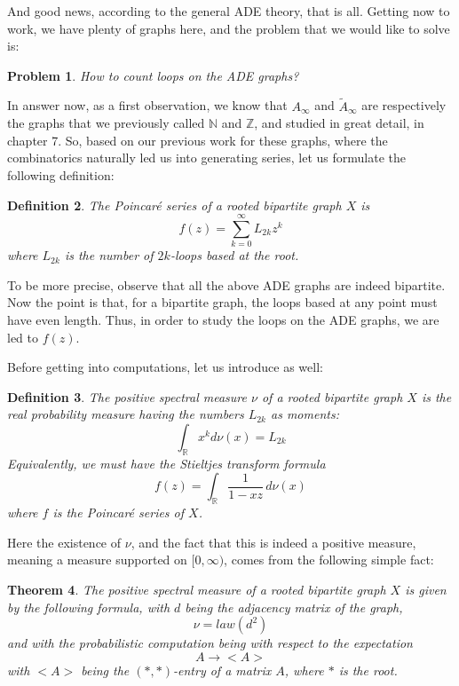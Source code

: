 \documentclass[12pt]{amsbook}
\newtheorem{theorem}{Theorem}[chapter]
\newtheorem{definition}[theorem]{Definition}
\newtheorem{problem}[theorem]{Problem}
\begin{document}
And good news, according to the general ADE theory, that is all. Getting now to work, we have plenty of graphs here, and the problem that we would like to solve is:

\begin{problem}
How to count loops on the ADE graphs?
\end{problem}

In answer now, as a first observation, we know that $A_\infty$ and $\tilde{A}_\infty$ are respectively the graphs that we previously called $\mathbb N$ and $\mathbb Z$, and studied in great detail, in chapter 7. So, based on our previous work for these graphs, where the combinatorics naturally led us into generating series, let us formulate the following definition:


\begin{definition}
The Poincar\'e series of a rooted bipartite graph $X$ is
$$f(z)=\sum_{k=0}^\infty L_{2k}z^k$$
where $L_{2k}$ is the number of $2k$-loops based at the root.
\end{definition}

To be more precise, observe that all the above ADE graphs are indeed bipartite. Now the point is that, for a bipartite graph, the loops based at any point must have even length. Thus, in order to study the loops on the ADE graphs, we are led to $f(z)$.

\bigskip

Before getting into computations, let us introduce as well:


\begin{definition}
The positive spectral measure $\nu$ of a rooted bipartite graph $X$ is the real probability measure having the numbers $L_{2k}$ as moments:
$$\int_\mathbb Rx^kd\nu(x)=L_{2k}$$
Equivalently, we must have the Stieltjes transform formula
$$f(z)=\int_\mathbb R\frac{1}{1-xz}\,d\nu(x)$$
where $f$ is the Poincar\'e series of $X$.
\end{definition}

Here the existence of $\nu$, and the fact that this is indeed a positive measure, meaning a measure supported on $[0,\infty)$, comes from the following simple fact:

\begin{theorem}
The positive spectral measure of a rooted bipartite graph $X$ is given by the following formula, with $d$ being the adjacency matrix of the graph,
$$\nu=law(d^2)$$
and with the probabilistic computation being with respect to the expectation 
$$A\to<A>$$
with $<A>$ being the $(*,*)$-entry of a matrix $A$, where $*$ is the root.
\end{theorem}
\end{document}
